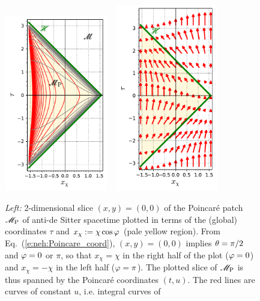 \begin{figure}
\centerline{\includegraphics[width=0.4\textwidth]{neh_AdS_Poincare_patch.pdf}\ \qquad \
\includegraphics[width=0.4\textwidth]{neh_AdS_Killing_vec.pdf}
}
\caption[]{\label{f:neh:AdS_example} \footnotesize
\emph{Left:} 2-dimensional slice $(x,y)=(0,0)$ of the Poincaré patch $\mathscr{M}_{\rm P}$ of anti-de Sitter spacetime plotted in terms of the (global) coordinates $\tau$ and
$x_\chi := \chi \cos\varphi$ (pale yellow region). From Eq.~(\ref{e:neh:Poincare_coord}),
$(x,y)=(0,0)$ implies $\theta=\pi/2$ and $\varphi=0$ or $\pi$, so that $x_\chi = \chi$
in the right half of the plot ($\varphi=0$) and $x_\chi = - \chi$ in the left half
($\varphi=\pi$). The plotted slice of $\mathscr{M}_{\rm P}$ is thus spanned by the
Poincaré coordinates $(t,u)$.
The red lines are curves of constant $u$, i.e. integral curves of
}
\end{figure}
